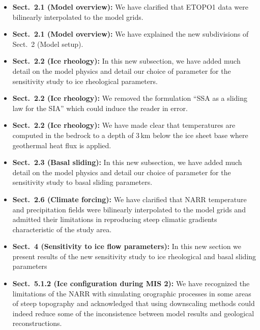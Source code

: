 \begin{itemize}

    \item \textbf{Sect.~2.1 (Model overview):}
    We have clarified that ETOPO1 data were bilinearly interpolated to the
    model grids.

    \item \textbf{Sect.~2.1 (Model overview):}
    We have explained the new subdivisions of Sect.~2 (Model setup).

    \item \textbf{Sect.~2.2 (Ice rheology):}
    In this new subsection, we have added much detail on the model physics and
    detail our choice of parameter for the sensitivity study to ice rheological
    parameters.

    \item \textbf{Sect.~2.2 (Ice rheology):}
    We removed the formulation ``SSA as a sliding law for the SIA'' which could
    induce the reader in error.

    \item \textbf{Sect.~2.2 (Ice rheology):}
    We have made clear that temperatures are computed in the bedrock to a depth
    of 3\,km below the ice sheet base where geothermal heat flux is applied.

    \item \textbf{Sect.~2.3 (Basal sliding):}
    In this new subsection, we have added much detail on the model physics and
    detail our choice of parameter for the sensitivity study to basal sliding
    parameters.

    \item \textbf{Sect.~2.6 (Climate forcing):}
    We have clarified that NARR temperature and precipitation fields were
    bilinearly interpolated to the model grids and admitted their limitations
    in reproducing steep climatic gradients characteristic of the study area.

    \item \textbf{Sect.~4 (Sensitivity to ice flow parameters):}
    In this new section we present results of the new sensitivity study to ice
    rheological and basal sliding parameters

    \item \textbf{Sect.~5.1.2 (Ice configuration during MIS 2):}
    We have recognized the limitations of the NARR with simulating orographic
    processes in some areas of steep topography and acknowledged that using
    downscaling methods could indeed reduce some of the inconsistence between
    model results and geological reconstructions.


\end{itemize}

